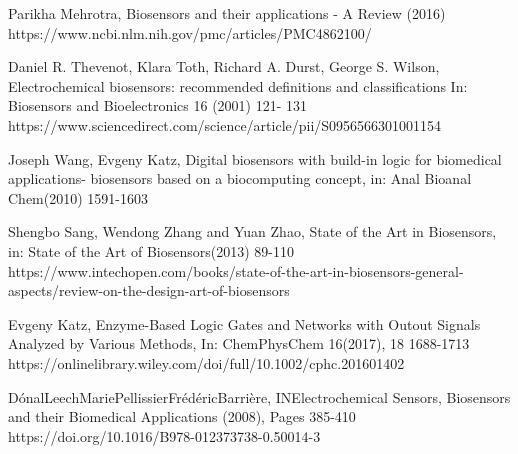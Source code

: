 \documentclass[runningheads]{llncs}
\begin{document}
\begin{thebibliography}{8}
	Parikha Mehrotra, Biosensors and their applications - A Review (2016) https://www.ncbi.nlm.nih.gov/pmc/articles/PMC4862100/
	
	Daniel R. Thevenot, Klara Toth, Richard A. Durst, George S. Wilson, Electrochemical biosensors: recommended definitions and classifications In: Biosensors and Bioelectronics 16 (2001) 121- 131 https://www.sciencedirect.com/science/article/pii/S0956566301001154
	
	Joseph Wang, Evgeny Katz, Digital biosensors with build-in logic for biomedical applications- biosensors based on a biocomputing concept, in: Anal Bioanal Chem(2010) 1591-1603
	
	Shengbo Sang, Wendong Zhang and Yuan Zhao, State of the Art in Biosensors, in: State of the Art of Biosensors(2013) 89-110 https://www.intechopen.com/books/state-of-the-art-in-biosensors-general-aspects/review-on-the-design-art-of-biosensors
	
	Evgeny Katz, Enzyme-Based Logic Gates and Networks with Outout Signals Analyzed by Various Methods, In: ChemPhysChem 16(2017), 18 1688-1713 https://onlinelibrary.wiley.com/doi/full/10.1002/cphc.201601402
	
	DónalLeechMariePellissierFrédéricBarrière, INElectrochemical Sensors, Biosensors and their Biomedical Applications (2008), Pages 385-410 https://doi.org/10.1016/B978-012373738-0.50014-3
	
\end{thebibliography}
\end{document}
